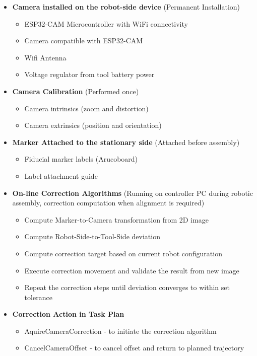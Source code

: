 \begin{itemize}
    \item \textbf{Camera installed on the robot-side device} (Permanent Installation)
    \begin{itemize}[nosep]
        \item ESP32-CAM Microcontroller with WiFi connectivity
        \item Camera compatible with ESP32-CAM
        \item Wifi Antenna
        \item Voltage regulator from tool battery power
    \end{itemize}
    \item \textbf{Camera Calibration} (Performed once)
    \begin{itemize}[nosep]
        \item Camera intrinsics (zoom and distortion)
        \item Camera extrinsics (position and orientation)
    \end{itemize}
    \item \textbf{Marker Attached to the stationary side} (Attached before assembly)
    \begin{itemize}[nosep]
        \item Fiducial marker labels (Arucoboard)
        \item Label attachment guide
    \end{itemize}
    \item \textbf{On-line Correction Algorithms} (Running on controller PC during robotic assembly, correction computation when alignment is required)
    \begin{itemize}[nosep]
        \item Compute Marker-to-Camera transformation from 2D image
        \item Compute Robot-Side-to-Tool-Side deviation
        \item Compute correction target based on current robot configuration
        \item Execute correction movement and validate the result from new image
        \item Repeat the correction steps until deviation converges to within set tolerance
    \end{itemize}
    \item \textbf{Correction Action in Task Plan}
    \begin{itemize}[nosep]
        \item AquireCameraCorrection - to initiate the correction algorithm
        \item CancelCameraOffset - to cancel offset and return to planned trajectory
    \end{itemize}
\end{itemize}

